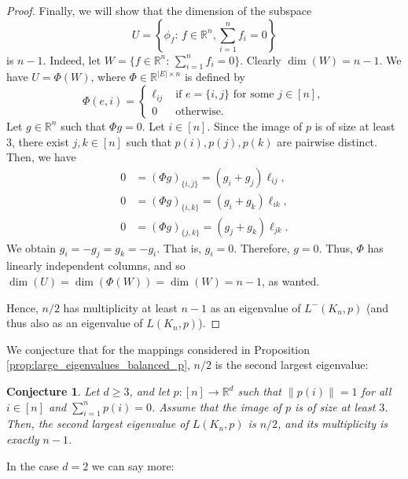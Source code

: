 \documentclass[a4paper,11pt]{article}
\theoremstyle{plain}
\newtheorem{conjecture}[theorem]{\bf Conjecture}
\theoremstyle{definition}
\newcommand{\Rea}{{\mathbb R}}
\begin{document}
\begin{proof}
Finally, we will show that the dimension of the subspace
\[
    U=\left\{\phi_f:\, f\in \Rea^n, \sum_{i=1}^n f_i=0\right\}
\]
is $n-1$. Indeed, let $W=\{ f\in \Rea^n:\, \sum_{i=1}^n f_i=0\}$. Clearly $\dim(W)=n-1$. We have $U=\Phi(W)$, where $\Phi\in \Rea^{|E|\times n}$ is defined by
\[
    \Phi(e,i)=
    \begin{cases}
        \ell_{i j} & \text{ if } e=\{i,j\} \text{ for some } j\in[n],\\
        0 & \text{ otherwise.}
        \end{cases}
\]
Let $g\in \Rea^n$ such that $\Phi g=0$. Let $i\in[n]$. Since the image of $p$ is of size at least $3$, there exist $j,k\in[n]$ such that $p(i),p(j),p(k)$ are pairwise distinct. Then, we have
\begin{align*}
    0&=(\Phi g)_{\{i,j\}}= (g_i+g_j)\ell_{i j},
\\
    0&=(\Phi g)_{\{i,k\}}= (g_i+g_k)\ell_{i k},
\\
    0&=(\Phi g)_{\{j,k\}}= (g_j+g_k)\ell_{j k}.
\end{align*}
We obtain $g_i=-g_j=g_k=-g_i$. 
That is, $g_i=0$. Therefore, $g=0$. Thus, $\Phi$ has linearly independent columns, and so $\dim(U)=\dim(\Phi(W))= \dim(W)=n-1$, as wanted.

Hence, $n/2$ has multiplicity at least $n-1$ as an eigenvalue of $L^{-}(K_n,p)$ (and thus also as an eigenvalue of $L(K_n,p)$).
\end{proof}

We conjecture that for the mappings considered in Proposition \ref{prop:large_eigenvalues_balanced_p}, $n/2$ is the second largest eigenvalue:

\begin{conjecture}\label{conj:largest_eig_spherical}
Let $d\geq 3$, and let $p:[n]\to\Rea^d$ such that $\|p(i)\|=1$ for all $i\in[n]$ and $\sum_{i=1}^n p(i)=0$. Assume that the image of $p$ is of size at least $3$. Then, the second largest eigenvalue of $L(K_n,p)$ is $n/2$, and its multiplicity is exactly $n-1$.
\end{conjecture}

In the case $d=2$ we can say more:
\end{document}
